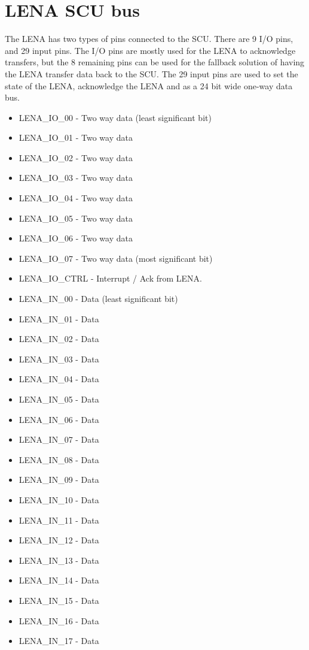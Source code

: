 \chapter {LENA SCU bus}
The LENA has two types of pins connected to the SCU. There are 9 I/O pins, and 29 input pins. The I/O pins are mostly used for the LENA to acknowledge transfers, but the 8 remaining pins can be used for the fallback solution of having the LENA transfer data back to the SCU. The 29 input pins are used to set the state of the LENA, acknowledge the LENA and as a 24 bit wide one-way data bus.

\begin{itemize}
\item LENA\_IO\_00 - Two way data (least significant bit)
\item LENA\_IO\_01 - Two way data
\item LENA\_IO\_02 - Two way data
\item LENA\_IO\_03 - Two way data
\item LENA\_IO\_04 - Two way data
\item LENA\_IO\_05 - Two way data
\item LENA\_IO\_06 - Two way data
\item LENA\_IO\_07 - Two way data (most significant bit)
\item LENA\_IO\_CTRL - Interrupt / Ack from LENA.
\item LENA\_IN\_00 - Data (least significant bit)
\item LENA\_IN\_01 - Data
\item LENA\_IN\_02 - Data
\item LENA\_IN\_03 - Data
\item LENA\_IN\_04 - Data
\item LENA\_IN\_05 - Data
\item LENA\_IN\_06 - Data
\item LENA\_IN\_07 - Data
\item LENA\_IN\_08 - Data
\item LENA\_IN\_09 - Data
\item LENA\_IN\_10 - Data
\item LENA\_IN\_11 - Data
\item LENA\_IN\_12 - Data
\item LENA\_IN\_13 - Data
\item LENA\_IN\_14 - Data
\item LENA\_IN\_15 - Data
\item LENA\_IN\_16 - Data
\item LENA\_IN\_17 - Data

\end{itemize}
